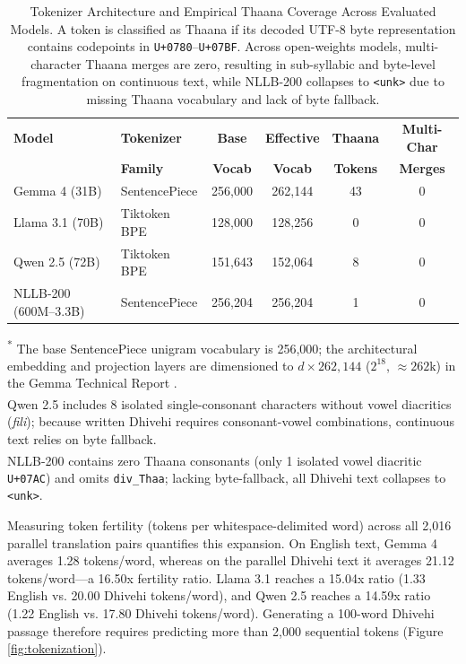 \documentclass[acmsmall,review,anonymous]{acmart}
\begin{document}
\begin{table}[t]
\centering
\small
\caption{Tokenizer Architecture and Empirical Thaana Coverage Across Evaluated Models. A token is classified as Thaana if its decoded UTF-8 byte representation contains codepoints in \texttt{U+0780}--\texttt{U+07BF}. Across open-weights models, multi-character Thaana merges are zero, resulting in sub-syllabic and byte-level fragmentation on continuous text, while NLLB-200 collapses to \texttt{<unk>} due to missing Thaana vocabulary and lack of byte fallback.}
\label{tab:tokenizer_vocab}
\begin{tabular*}{\textwidth}{@{\extracolsep{\fill}}llcccc@{}}
\toprule
\textbf{Model} & \textbf{Tokenizer} & \textbf{Base} & \textbf{Effective} & \textbf{Thaana} & \textbf{Multi-Char} \\
 & \textbf{Family} & \textbf{Vocab} & \textbf{Vocab} & \textbf{Tokens} & \textbf{Merges} \\
\midrule
Gemma 4 (31B) & SentencePiece & 256,000 & 262,144\rlap{\textsuperscript{*}} & 43 & 0 \\
Llama 3.1 (70B) & Tiktoken BPE & 128,000 & 128,256 & 0 & 0 \\
Qwen 2.5 (72B) & Tiktoken BPE & 151,643 & 152,064 & 8\rlap{\textsuperscript{\dag}} & 0 \\
NLLB-200 (600M--3.3B) & SentencePiece & 256,204 & 256,204 & 1\rlap{\textsuperscript{\ddag}} & 0 \\
\bottomrule
\end{tabular*}
\begin{flushleft}
\footnotesize
\textsuperscript{*} The base SentencePiece unigram vocabulary is 256,000; the architectural embedding and projection layers are dimensioned to $d \times 262,144$ ($2^{18}$, $\approx 262\text{k}$) in the Gemma Technical Report \cite{team_gemma_2026}.\\
\textsuperscript{\dag} Qwen 2.5 includes 8 isolated single-consonant characters without vowel diacritics (\textit{fili}); because written Dhivehi requires consonant-vowel combinations, continuous text relies on byte fallback.\\
\textsuperscript{\ddag} NLLB-200 contains zero Thaana consonants (only 1 isolated vowel diacritic \texttt{U+07AC}) and omits \texttt{div\_Thaa}; lacking byte-fallback, all Dhivehi text collapses to \texttt{<unk>}.
\end{flushleft}
\end{table} 

Measuring token fertility (tokens per whitespace-delimited word) across all 2,016 parallel translation pairs quantifies this expansion. On English text, Gemma 4 averages 1.28 tokens/word, whereas on the parallel Dhivehi text it averages 21.12 tokens/word---a 16.50x fertility ratio. Llama 3.1 reaches a 15.04x ratio (1.33 English vs. 20.00 Dhivehi tokens/word), and Qwen 2.5 reaches a 14.59x ratio (1.22 English vs. 17.80 Dhivehi tokens/word). Generating a 100-word Dhivehi passage therefore requires predicting more than 2,000 sequential tokens (Figure \ref{fig:tokenization}).
\end{document}
